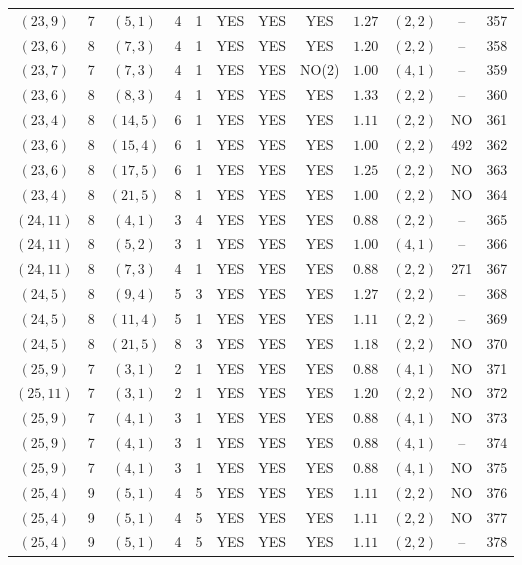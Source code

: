 \begin{longtable}{|c|c|c|c|c|c|c|c|c|c|c|c|}
$(23,9)$ & 7 & $(5,1)$ & 4 & 1 & YES & YES & YES & $1.27$ & $(2,2)$ & -- & 357\\
$(23,6)$ & 8 & $(7,3)$ & 4 & 1 & YES & YES & YES & $1.20$ & $(2,2)$ & -- & 358\\
$(23,7)$ & 7 & $(7,3)$ & 4 & 1 & YES & YES & NO(2) & $1.00$ & $(4,1)$ & -- & 359\\
$(23,6)$ & 8 & $(8,3)$ & 4 & 1 & YES & YES & YES & $1.33$ & $(2,2)$ & -- & 360\\
$(23,4)$ & 8 & $(14,5)$ & 6 & 1 & YES & YES & YES & $1.11$ & $(2,2)$ & NO & 361\\
$(23,6)$ & 8 & $(15,4)$ & 6 & 1 & YES & YES & YES & $1.00$ & $(2,2)$ & 492 & 362\\
$(23,6)$ & 8 & $(17,5)$ & 6 & 1 & YES & YES & YES & $1.25$ & $(2,2)$ & NO & 363\\
$(23,4)$ & 8 & $(21,5)$ & 8 & 1 & YES & YES & YES & $1.00$ & $(2,2)$ & NO & 364\\
$(24,11)$ & 8 & $(4,1)$ & 3 & 4 & YES & YES & YES & $0.88$ & $(2,2)$ & -- & 365\\
$(24,11)$ & 8 & $(5,2)$ & 3 & 1 & YES & YES & YES & $1.00$ & $(4,1)$ & -- & 366\\
$(24,11)$ & 8 & $(7,3)$ & 4 & 1 & YES & YES & YES & $0.88$ & $(2,2)$ & 271 & 367\\
$(24,5)$ & 8 & $(9,4)$ & 5 & 3 & YES & YES & YES & $1.27$ & $(2,2)$ & -- & 368\\
$(24,5)$ & 8 & $(11,4)$ & 5 & 1 & YES & YES & YES & $1.11$ & $(2,2)$ & -- & 369\\
$(24,5)$ & 8 & $(21,5)$ & 8 & 3 & YES & YES & YES & $1.18$ & $(2,2)$ & NO & 370\\
$(25,9)$ & 7 & $(3,1)$ & 2 & 1 & YES & YES & YES & $0.88$ & $(4,1)$ & NO & 371\\
$(25,11)$ & 7 & $(3,1)$ & 2 & 1 & YES & YES & YES & $1.20$ & $(2,2)$ & NO & 372\\
$(25,9)$ & 7 & $(4,1)$ & 3 & 1 & YES & YES & YES & $0.88$ & $(4,1)$ & NO & 373\\
$(25,9)$ & 7 & $(4,1)$ & 3 & 1 & YES & YES & YES & $0.88$ & $(4,1)$ & -- & 374\\
$(25,9)$ & 7 & $(4,1)$ & 3 & 1 & YES & YES & YES & $0.88$ & $(4,1)$ & NO & 375\\
$(25,4)$ & 9 & $(5,1)$ & 4 & 5 & YES & YES & YES & $1.11$ & $(2,2)$ & NO & 376\\
$(25,4)$ & 9 & $(5,1)$ & 4 & 5 & YES & YES & YES & $1.11$ & $(2,2)$ & NO & 377\\
$(25,4)$ & 9 & $(5,1)$ & 4 & 5 & YES & YES & YES & $1.11$ & $(2,2)$ & -- & 378\\

\end{longtable}
